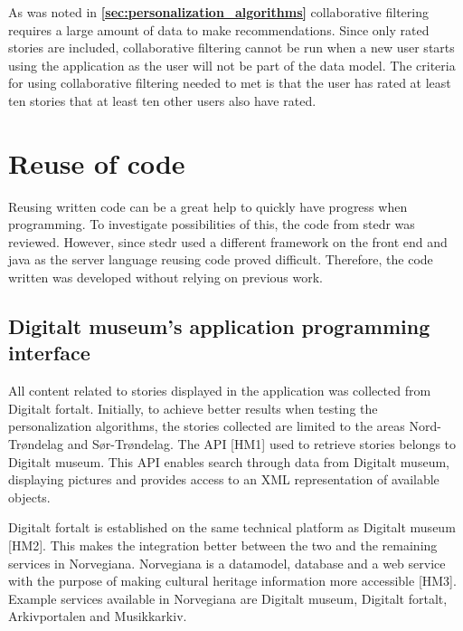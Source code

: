 As was noted in \textbf{\ref{sec:personalization_algorithms}} collaborative filtering requires a large amount of data to make recommendations. Since only rated stories are included, collaborative filtering cannot be run when a new user starts using the application as the user will not be part of the data model. The criteria for using collaborative filtering needed to met is that the user has rated at least ten stories that at least ten other users also have rated. 

\section{Reuse of code}

Reusing written code can be a great help to quickly have progress when programming.  To investigate possibilities of this, the code from stedr was reviewed. However, since stedr used a different framework on the front end and java as the server language reusing code proved difficult. Therefore, the code written was developed without relying on previous work.

\subsection{Digitalt museum’s application programming interface}
\label{subsec:api}

All content related to stories displayed in the application was collected from Digitalt fortalt. Initially, to achieve better results when testing the personalization algorithms, the stories collected are limited to the areas Nord-Trøndelag and Sør-Trøndelag. The API [HM1] used to retrieve stories belongs to Digitalt museum. This API enables search through data from Digitalt museum, displaying pictures and provides access to an XML representation of available objects.\newline

Digitalt fortalt is established on the same technical platform as Digitalt museum [HM2]. This makes the integration better between the two and the remaining services in Norvegiana. Norvegiana is a datamodel, database and a web service with the purpose of making cultural heritage information more accessible [HM3]. Example services available in Norvegiana are Digitalt museum, Digitalt fortalt, Arkivportalen and Musikkarkiv. 

\cleardoublepage